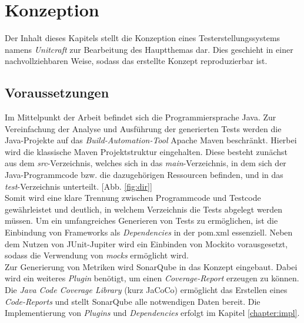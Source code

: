 \chapter{Konzeption}\label{chapter:concept}
Der Inhalt dieses Kapitels stellt die Konzeption eines Testerstellungssystems namens \textit{Unitcraft} zur Bearbeitung des Hauptthemas dar. Dies geschieht in einer nachvollziehbaren Weise, sodass das erstellte Konzept reproduzierbar ist.

\section{Voraussetzungen}
Im Mittelpunkt der Arbeit befindet sich die Programmiersprache Java. Zur Vereinfachung der Analyse und Ausführung der generierten Tests werden die Java-Projekte auf das \textit{Build-Automation-Tool} Apache Maven beschränkt. Hierbei wird die klassische Maven Projektstruktur eingehalten. Diese besteht zunächst aus dem \textit{src}-Verzeichnis, welches sich in das \textit{main}-Verzeichnis, in dem sich der Java-Programmcode bzw. die dazugehörigen Ressourcen befinden, und in das \textit{test}-Verzeichnis unterteilt. \cite{MavenIntroductionStandard} [Abb. \ref{fig:dir}]\\ Somit wird eine klare Trennung zwischen Programmcode und Testcode gewährleistet und deutlich, in welchem Verzeichnis die Tests abgelegt werden müssen.  \newpage
Um ein umfangreiches Generieren von Tests zu ermöglichen, ist die Einbindung von Frameworks als \textit{Dependencies} in der pom.xml essenziell. Neben dem Nutzen von JUnit-Jupiter wird ein Einbinden von Mockito vorausgesetzt, sodass die Verwendung von \textit{mocks} ermöglicht wird.\\
Zur Generierung von Metriken wird SonarQube in das Konzept eingebaut. Dabei wird ein weiteres \textit{Plugin} benötigt, um einen \textit{Coverage-Report} erzeugen zu können. Die \textit{Java Code Coverage Library} (kurz JaCoCo) ermöglicht das Erstellen eines \textit{Code-Reports} und stellt SonarQube alle notwendigen Daten bereit.
Die Implementierung von \textit{Plugins} und \textit{Dependencies} erfolgt im Kapitel \ref{chapter:impl}.

